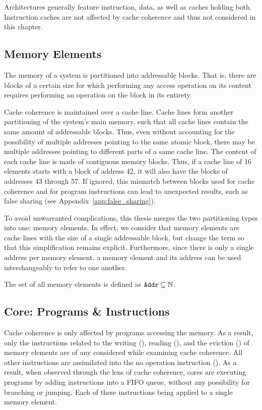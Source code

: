 Architectures generally feature instruction, data, as well as caches holding
both. Instruction caches are not affected by cache coherence and thus not
considered in this chapter.

\subsection{Memory Elements}%
\label{sec:memory_element}
The memory of a system is partitioned into addressable blocks. That is, there
are blocks of a certain size for which performing any access operation on its
content requires performing an operation on the block in its entirety.

Cache coherence is maintained over a cache line. Cache lines form another
partitioning of the system's main memory, such that all cache lines contain the
same amount of addressable blocks. Thus, even without accounting for the
possibility of multiple addresses pointing to the same atomic block, there may
be multiple addresses pointing to different parts of a same cache line. The
content of each cache line is made of contiguous memory blocks. Thus, if a
cache line of 16 elements starts with a block of address 42, it will also have
the blocks of addresses 43 through 57. If ignored, this mismatch between blocks
used for cache coherence and for program instructions can lead to unexpected
results, such as false sharing (see Appendix~\ref{app:false_sharing}).

To avoid unwarranted complications, this thesis merges the two partitioning
types into one: memory elements. In effect, we consider that memory elements
are cache lines with the size of a single addressable block, but change the
term so that this simplification remains explicit. Furthermore, since there is
only a single address per memory element, a memory element and its address can
be used interchangeably to refer to one another.

\begin{definition}
\label{def:memoryelement}
The set of all memory elements is defined as $\text{\texttt{Addr}}{} \subseteq
\mathbb{N}$.
\end{definition}

\subsection{Core: Programs \& Instructions}%
\label{sec:instructions}
Cache coherence is only affected by programs accessing the memory. As a result,
only the instructions related to the writing (\storeinstr{}), reading
(\loadinstr{}), and the eviction (\evictinstr{}) of memory elements are of any
considered while examining cache coherence. All other instructions are
assimilated into the no operation instruction (\nopinstr{}). As a result, when
observed through the lens of cache coherence, cores are executing programs by
adding instructions into a FIFO queue, without any possibility for branching or
jumping. Each of these instructions being applied to a single memory element.

